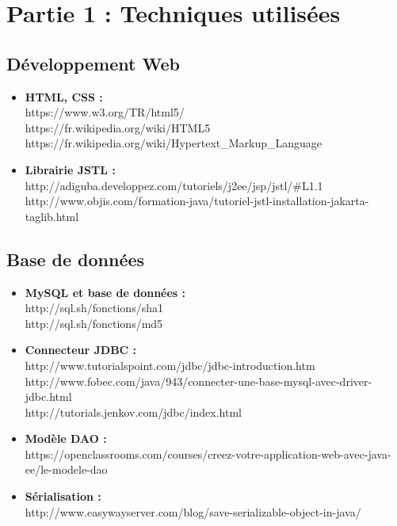 \section{Partie 1 : Techniques utilisées}
\subsection{Développement Web}
\begin{itemize}
 \item \textbf{HTML, CSS : \\}
    https://www.w3.org/TR/html5/ \\
    https://fr.wikipedia.org/wiki/HTML5 \\
    https://fr.wikipedia.org/wiki/Hypertext\_Markup\_Language
 \item \textbf{Librairie JSTL : \\}
    http://adiguba.developpez.com/tutoriels/j2ee/jsp/jstl/\#L1.1
    http://www.objis.com/formation-java/tutoriel-jstl-installation-jakarta-taglib.html
\end{itemize}    
    
\subsection{Base de données}
\begin{itemize}
 \item \textbf{MySQL et base de données : \\}
    http://sql.sh/fonctions/sha1 \\
    http://sql.sh/fonctions/md5
 \item \textbf{Connecteur JDBC : \\}    
    http://www.tutorialspoint.com/jdbc/jdbc-introduction.htm\\
    http://www.fobec.com/java/943/connecter-une-base-mysql-avec-driver-jdbc.html\\
    http://tutorials.jenkov.com/jdbc/index.html
 \item \textbf{Modèle DAO : \\}
    https://openclassrooms.com/courses/creez-votre-application-web-avec-java-ee/le-modele-dao
 \item \textbf{Sérialisation : \\}
    http://www.easywayserver.com/blog/save-serializable-object-in-java/ 
\end{itemize}

